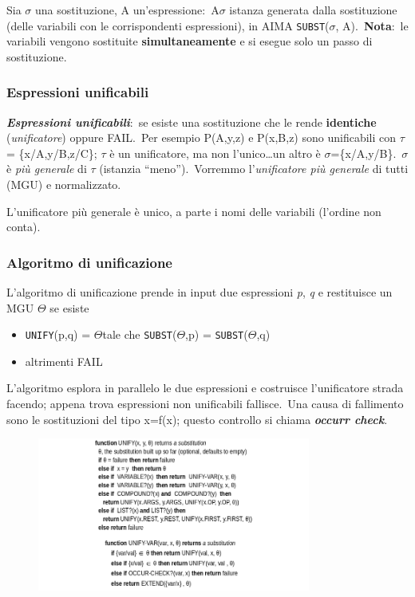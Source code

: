 Sia $\sigma$ una sostituzione, A un'espressione:\ A$\sigma$ istanza generata dalla sostituzione (delle variabili con le corrispondenti espressioni), in AIMA \texttt{SUBST}($\sigma$, A).\
\textbf{Nota}:\ le variabili vengono sostituite \textbf{simultaneamente} e si esegue solo un passo di sostituzione.

\subsubsection{Espressioni unificabili}

\textbf{\textit{Espressioni unificabili}}:\ se esiste una sostituzione che le rende \textbf{identiche} (\textit{unificatore}) oppure FAIL.\
Per esempio P(A,y,z) e P(x,B,z) sono unificabili con $\tau$ = \{x/A,y/B,z/C\}; $\tau$ è un unificatore, ma non l'unico\dots un altro è $\sigma$=\{x/A,y/B\}.\
$\sigma$ è \textit{più generale} di $\tau$ (istanzia ``meno'').\
Vorremmo l'\textit{unificatore più generale} di tutti (MGU) e normalizzato.\

\begin{theorem}
	L'unificatore più generale è unico, a parte i nomi delle variabili (l'ordine non conta).
\end{theorem}

\subsubsection{Algoritmo di unificazione}

L'algoritmo di unificazione prende in input due espressioni \textit{p}, \textit{q} e restituisce un MGU $\Theta$ se esiste

\begin{itemize}
	\item \texttt{UNIFY}(p,q) = $\Theta$\quad tale che \quad\texttt{SUBST}($\Theta$,p) = \texttt{SUBST}($\Theta$,q)
	\item altrimenti FAIL
\end{itemize}

\noindent L'algoritmo esplora in parallelo le due espressioni e costruisce l'unificatore strada facendo; appena trova espressioni non unificabili fallisce.\
Una causa di fallimento sono le sostituzioni del tipo x=f(x); questo controllo si chiama \textbf{\textit{occurr check}}.

\begin{figure}[H]
	\centering
	\includegraphics[width=0.8\textwidth]{immagini/sostituzione_alg.png}
\end{figure}

